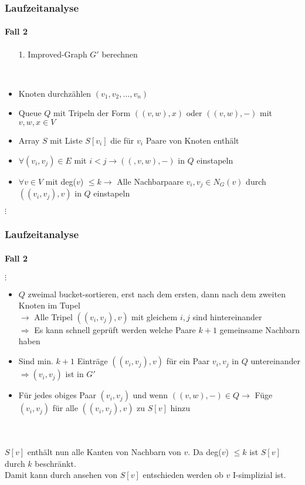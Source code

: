 
\begin{frame}
\frametitle{Laufzeitanalyse}
\framesubtitle{Fall 2}

\begin{enumerate}
	\item[1.] Improved-Graph $G'$ berechnen
\end{enumerate}
\ \\
\begin{itemize} %
	\item Knoten durchzählen $(v_1, v_2, \dots, v_n)$
	\item Queue $Q$ mit Tripeln der Form $((v,w),x)$ oder $((v,w),-)$ mit $v,w,x \in V$
	\item Array $S$ mit Liste $S[v_i]$ die für $v_i$ Paare von Knoten enthält
	\item $\forall (v_i, v_j) \in E$ mit $i < j \rightarrow((,v,w),-)$ in $Q$ einstapeln
	\item $\forall v \in V$ mit deg($v$) $\leq k \rightarrow$ Alle Nachbarpaare $v_i, v_j \in N_G(v)$ durch $((v_i, v_j),v)$ in $Q$ einstapeln
\end{itemize}
$\vdots$

\end{frame}


\begin{frame}
\frametitle{Laufzeitanalyse}
\framesubtitle{Fall 2}

$\vdots$
\begin{itemize}
	\item $Q$ zweimal bucket-sortieren, erst nach dem ersten, dann nach dem zweiten Knoten im Tupel \\
	$\rightarrow$ Alle Tripel $((v_i, v_j),v)$ mit gleichem $i,j$ sind hintereinander \\
	$\Rightarrow$ Es kann schnell geprüft werden welche Paare $k+1$ gemeinsame Nachbarn haben
	\item Sind min. $k+1$ Einträge $((v_i, v_j), v)$ für ein Paar $v_i, v_j$ in $Q$ untereinander $\Rightarrow (v_i, v_j)$ ist in $G'$
	\item Für jedes obiges Paar $(v_i, v_j)$ und wenn $((v,w),-) \in Q \rightarrow$ Füge $(v_i, v_j)$ für alle $((v_i, v_j), v)$ zu $S[v]$ hinzu
\end{itemize}
\ \\
\ \\

$S[v]$ enthält nun alle Kanten von Nachbarn von $v$. Da deg($v$) $\leq k$ ist $S[v]$ durch $k$ beschränkt. \\
Damit kann durch ansehen von $S[v]$ entschieden werden ob $v$ I-simplizial ist.
\end{frame}



